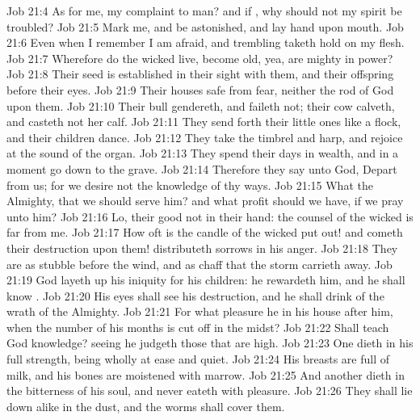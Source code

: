 \vs Job 21:4 As for me,  my complaint to man? and if , why should not my spirit be troubled?
\vs Job 21:5 Mark me, and be astonished, and lay  hand upon  mouth.
\vs Job 21:6 Even when I remember I am afraid, and trembling taketh hold on my flesh.
\vs Job 21:7 Wherefore do the wicked live, become old, yea, are mighty in power?
\vs Job 21:8 Their seed is established in their sight with them, and their offspring before their eyes.
\vs Job 21:9 Their houses  safe from fear, neither  the rod of God upon them.
\vs Job 21:10 Their bull gendereth, and faileth not; their cow calveth, and casteth not her calf.
\vs Job 21:11 They send forth their little ones like a flock, and their children dance.
\vs Job 21:12 They take the timbrel and harp, and rejoice at the sound of the organ.
\vs Job 21:13 They spend their days in wealth, and in a moment go down to the grave.
\vs Job 21:14 Therefore they say unto God, Depart from us; for we desire not the knowledge of thy ways.
\vs Job 21:15 What  the Almighty, that we should serve him? and what profit should we have, if we pray unto him?
\vs Job 21:16 Lo, their good  not in their hand: the counsel of the wicked is far from me.
\vs Job 21:17 How oft is the candle of the wicked put out! and  cometh their destruction upon them!  distributeth sorrows in his anger.
\vs Job 21:18 They are as stubble before the wind, and as chaff that the storm carrieth away.
\vs Job 21:19 God layeth up his iniquity for his children: he rewardeth him, and he shall know .
\vs Job 21:20 His eyes shall see his destruction, and he shall drink of the wrath of the Almighty.
\vs Job 21:21 For what pleasure  he in his house after him, when the number of his months is cut off in the midst?
\vs Job 21:22 Shall  teach God knowledge? seeing he judgeth those that are high.
\vs Job 21:23 One dieth in his full strength, being wholly at ease and quiet.
\vs Job 21:24 His breasts are full of milk, and his bones are moistened with marrow.
\vs Job 21:25 And another dieth in the bitterness of his soul, and never eateth with pleasure.
\vs Job 21:26 They shall lie down alike in the dust, and the worms shall cover them.
